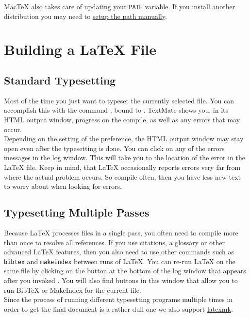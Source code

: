 \documentclass[11pt, x11names]{article}
\begin{document}
MacTeX also takes care of updating your \texttt{PATH} variable. If you install another distribution you may need to \href{http://blog.macromates.com/2014/defining-a-path}{setup the path manually}.

\section{Building a LaTeX File}

\subsection{Standard Typesetting}

Most of the time you just want to typeset the currently selected file. You can accomplish this with the command , bound to . TextMate shows you, in its HTML output window, progress on the compile, as well as any errors that may occur.\\

Depending on the setting of the  preference, the HTML output window may stay open even after the typesetting is done. You can click on any of the errors messages in the log window. This will take you to the location of the error in the LaTeX file. Keep in mind, that LaTeX occasionally reports errors very far from where the actual problem occurs. So compile often, then you have less new text to worry about when looking for errors.

\subsection{Typesetting Multiple
Passes}

Because LaTeX processes files in a single pass, you often need to compile more than once to resolve all references. If you use citations, a glossary or other advanced LaTeX features, then you also need to use other commands such as \texttt{bibtex} and \texttt{makeindex} between runs of LaTeX. You can re-run LaTeX on the same file by clicking on the  button at the bottom of the log window that appears after you invoked . You will also find buttons in this window that allow you to run BibTeX or MakeIndex for the current file.\\

Since the process of running different typesetting programs multiple times in order to get the final document is a rather dull one we also support \href{http://ctan.org/pkg/latexmk}{latexmk}:
\end{document}
